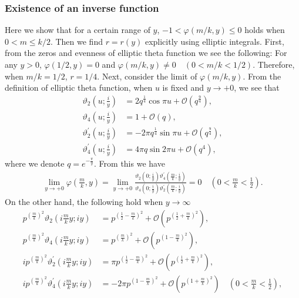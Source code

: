 \documentclass[10pt,leqno]{amsart}
\numberwithin{equation}{section}
\begin{document}
\subsubsection{Existence of an inverse function}\label{subsubsection:Proof of existence of inverse function}
Here we show that for a certain range of $y$, $-1<\varphi\left(m/k,y\right)\leq 0$ holds when $0<m\leq k/2$. 
Then we find $r=r(y)$ explicitly using elliptic integrals.
First, from the zeros and evenness of elliptic theta function we see the following: For any $y>0$, $\varphi(1/2,y)=0$ and $\varphi(m/k,y)\neq 0 \quad(0<m/k<1/2)$.
Therefore, when $m/k=1/2$, $r=1/4$.
Next, consider the limit of $\varphi(m/k,y)$. From the definition of elliptic theta function, when $u$ is fixed and $y\rightarrow +0$, we see that
\begin{align}
\vartheta_2 \left(u; \frac{i}{y}\right)
&= 2q^{\frac{1}{4}}\cos \pi u +  \mathcal{O} (q^{\frac{9}{4}}), \\
\vartheta_4 \left(u; \frac{i}{y}\right)
&= 1 +  \mathcal{O} (q), \nonumber\\
\vartheta_2^{'} \left(u; \frac{i}{y}\right)
&= -2\pi q^{\frac{1}{4}}\sin \pi u +  \mathcal{O} (q^{\frac{9}{4}}), \nonumber\\
\vartheta_4^{'} \left(u; \frac{i}{y}\right)
&= 4\pi q\sin 2\pi u +  \mathcal{O} (q^{4}),\nonumber
\end{align}
where we denote $q=e^{-\frac{\pi}{y}}$.
From this we have
\begin{align}
    \lim_{y\to +0}\varphi\left(\frac{m}{k},y\right)=\lim_{y\to +0}\frac{\vartheta_2\left(0;\frac{i}{y}\right)\vartheta_4^{'}\left(\frac{m}{k};\frac{i}{y}\right)}{\vartheta_4\left(0;\frac{i}{y}\right)\vartheta_2^{'}\left(\frac{m}{k};\frac{i}{y}\right)}=0\quad(0<\frac{m}{k}<\frac{1}{2}).
\end{align}
On the other hand, the following hold when $y\rightarrow \infty$
\begin{align}
p^{\left(\frac{m}{k}\right)^2}\vartheta_2 \left(i\frac{m}{k}y; iy\right)
&= p^{\left(\frac{1}{2}-\frac{m}{k}\right)^2} +  \mathcal{O} (p^{\left(\frac{1}{2}+\frac{m}{k}\right)^2}), \\
p^{\left(\frac{m}{k}\right)^2}\vartheta_4 \left(i\frac{m}{k}y; iy\right)
&= p^{\left(\frac{m}{k}\right)^2} +  \mathcal{O} (p^{\left(1-\frac{m}{k}\right)^2}), \nonumber\\
ip^{\left(\frac{m}{k}\right)^2}\vartheta_2^{'} \left(i\frac{m}{k}y; iy\right)
&= \pi p^{\left(\frac{1}{2}-\frac{m}{k}\right)^2} +  \mathcal{O} (p^{\left(\frac{1}{2}+\frac{m}{k}\right)^2}), \nonumber\\
ip^{\left(\frac{m}{k}\right)^2}\vartheta_4^{'} \left(i\frac{m}{k}y; iy\right)
&=-2\pi p^{\left(1-\frac{m}{k}\right)^2} +  \mathcal{O} (p^{\left(1+\frac{m}{k}\right)^2})\quad(0<\frac{m}{k}<\frac{1}{2}),\nonumber
\end{align}
\end{document}
